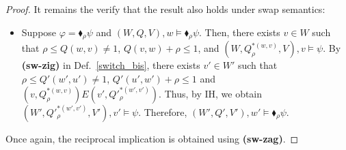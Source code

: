 \begin{proof}
    It remains the verify that the result also holds under swap semantics:
    \begin{itemize}
            \item Suppose $\varphi=\blacklozenge_\rho\psi$ and $(W,{Q},V),w\models\blacklozenge_\rho\psi$. Then, there exists $v\in W$ such that
                $\rho \leq {Q}(w,v) \neq 1$, 
                ${Q}(v,w)+\rho\leq 1$, and
                $(W,{Q}^{*(w,v)}_\rho,V),v\models\psi$. 
            By \textbf{(sw-zig)} in Def.~\ref{switch_bis}, there exists $v'\in W'$ such that
               $\rho\le Q'(w',u')\neq 1$, $Q'(u',w')+\rho\le 1$ 
                and 
                $(v,{Q}^{*(w,v)}_\rho)E(v',{Q}'^{*(w',v')}_\rho)$. 
            Thus, by IH, we obtain 
            $(W',{Q}'^{*(w',v')}_\rho,V'),v'\models\psi$. 
            Therefore, 
                $(W',{Q}',V'),w'\models\blacklozenge_\rho\psi$.
        \end{itemize}
         Once again, the reciprocal implication is obtained using \textbf{(sw-zag)}.
\end{proof}

